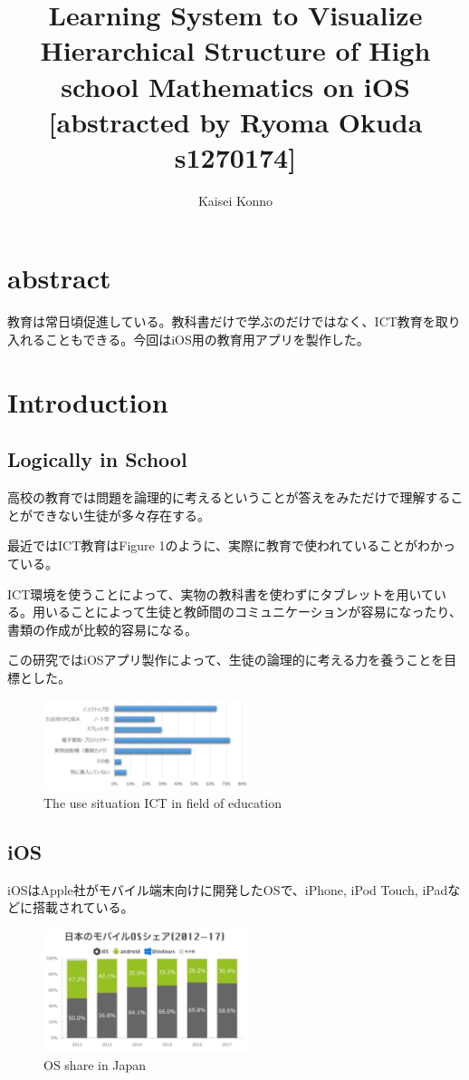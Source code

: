 \documentclass[ams]{U-AizuGT}
\author{Kaisei Konno}
\title{Learning System to Visualize Hierarchical Structure of High school Mathematics on iOS [abstracted by Ryoma Okuda s1270174]}
\begin{document}
	\maketitle
	\section{abstract}
		教育は常日頃促進している。教科書だけで学ぶのだけではなく、ICT教育を取り入れることもできる。今回はiOS用の教育用アプリを製作した。

	\section{Introduction}
		\subsection{Logically in School}
		高校の教育では問題を論理的に考えるということが答えをみただけで理解することができない生徒が多々存在する。

    最近ではICT教育はFigure 1のように、実際に教育で使われていることがわかっている。

    ICT環境を使うことによって、実物の教科書を使わずにタブレットを用いている。用いることによって生徒と教師間のコミュニケーションが容易になったり、書類の作成が比較的容易になる。

    この研究ではiOSアプリ製作によって、生徒の論理的に考える力を養うことを目標とした。

    \begin{figure}[htb]
      \centering
      \includegraphics[width=6cm]{img/figure1.pdf}
      \caption{The use situation ICT in field of education}
      \label{fig:ict}
    \end{figure}


		\subsection{iOS}
			iOSはApple社がモバイル端末向けに開発したOSで、iPhone, iPod Touch, iPadなどに搭載されている。

      \begin{figure}[htb]
        \centering
        \includegraphics[width=6cm]{img/figure2.pdf}
        \caption{OS share in Japan}
        \label{fig:ict}
      \end{figure}
\end{document}
